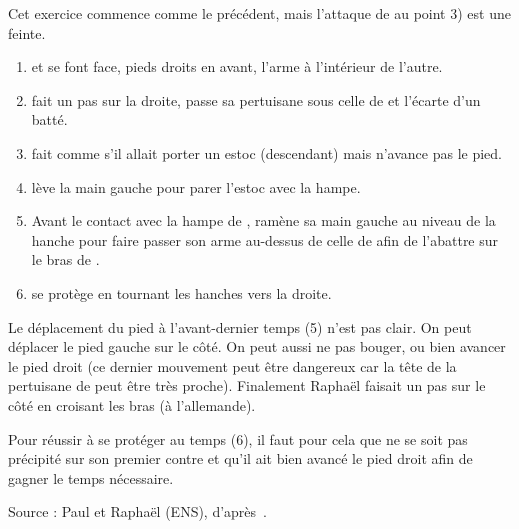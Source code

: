 \begin{exercice}
Cet exercice commence comme le précédent, mais l'attaque de \A au point 3) est une feinte.
\begin{enumerate}
	\item \A et \D se font face, pieds droits en avant, l'arme à l'intérieur de l'autre.
	
	\item \A fait un pas sur la droite, passe sa pertuisane sous celle de \D et l'écarte d'un batté.
	
	\item \A fait comme s'il allait porter un estoc (descendant) mais n'avance pas le pied.
	
	\item \D lève la main gauche pour parer l'estoc avec la hampe.
	
	\item Avant le contact avec la hampe de \D, \A ramène sa main gauche au niveau de la hanche pour faire passer son arme au-dessus de celle de \D afin de l'abattre sur le bras de \D.
	
	\item \D se protège en tournant les hanches vers la droite.
\end{enumerate}

Le déplacement du pied à l'avant-dernier temps (5) n'est pas clair. On peut déplacer le pied gauche sur le côté. On peut aussi ne pas bouger, ou bien avancer le pied droit (ce dernier mouvement peut être dangereux car la tête de la pertuisane de \D peut être très proche). Finalement Raphaël faisait un pas sur le côté en croisant les bras (à l'allemande).

Pour réussir à se protéger au temps (6), il faut pour cela que \D ne se soit pas précipité sur son premier contre et qu'il ait bien avancé le pied droit afin de gagner le temps nécessaire.

Source : Paul et Raphaël (ENS), d'après~\cite{livermore:cornucopia:partizan:2014}.
\end{exercice}
